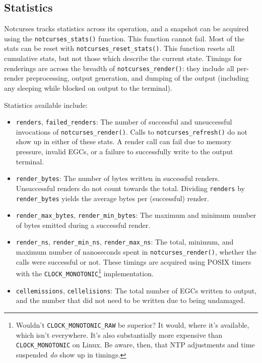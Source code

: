 \documentclass[letterpaper,10pt]{article}
\newenvironment{denseitemize}{
  \begin{itemize}
      \setlength{\itemsep}{0pt}
}{
  \end{itemize}
}
\begin{document}
\subsection{Statistics}
Notcurses tracks statistics across its operation, and a snapshot can be
acquired using the \texttt{notcurses\_stats()} function. This function cannot
fail. Most of the stats can be reset with \texttt{notcurses\_reset\_stats()}.
This function resets all cumulative stats, but not those which describe the
current state. Timings for renderings are across the breadth of
\texttt{notcurses\_render()}: they include all per-render preprocessing, output
generation, and dumping of the output (including any sleeping while blocked on
output to the terminal).

Statistics available include:
\begin{denseitemize}
\item{\texttt{renders}, \texttt{failed\_renders}: The number of successful and unsuccessful
    invocations of \texttt{notcurses\_render()}. Calls to \texttt{notcurses\_refresh()} do
    not show up in either of these stats. A render call can fail due to
    memory pressure, invalid EGCs, or a failure to successfully write to the
    output terminal.}
\item{\texttt{render\_bytes}: The number of bytes written in successful renders.
    Unsuccessful renders do not count towards the total. Dividing \texttt{renders}
  by \texttt{render\_bytes} yields the average bytes per (successful) render.}
\item{\texttt{render\_max\_bytes}, \texttt{render\_min\_bytes}: The maximum and
  minimum number of bytes emitted during a successful render.}
\item{\texttt{render\_ns}, \texttt{render\_min\_ns}, \texttt{render\_max\_ns}:
  The total, minimum, and maximum number of nanoseconds spent in \texttt{notcurses\_render()},
  whether the calls were successful or not. These timings are acquired using
  POSIX timers\cite{clockgettime} with the
  \texttt{CLOCK\_MONOTONIC}\footnote{Wouldn't \texttt{CLOCK\_MONOTONIC\_RAW} be
  superior? It would, where it's available, which isn't everywhere. It's also
  substantially more expensive than \texttt{CLOCK\_MONOTONIC} on Linux. Be
  aware, then, that NTP adjustments and time suspended \textit{do} show up in
  timings.} implementation.}
\item{\texttt{cellemissions}, \texttt{cellelisions}: The total number of EGCs
  written to output, and the number that did not need to be written due to
  being undamaged.}

\end{denseitemize}
\end{document}
